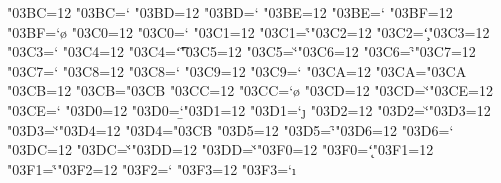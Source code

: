 \catcode"03BC=12 \lccode"03BC=`\m
\catcode"03BD=12 \lccode"03BD=`\n
\catcode"03BE=12 \lccode"03BE=`\x
\catcode"03BF=12 \lccode"03BF=`\o
\catcode"03C0=12 \lccode"03C0=`\p
\catcode"03C1=12 \lccode"03C1=`\r
\catcode"03C2=12 \lccode"03C2=`\c
\catcode"03C3=12 \lccode"03C3=`\s
\catcode"03C4=12 \lccode"03C4=`\t
\catcode"03C5=12 \lccode"03C5=`\u
\catcode"03C6=12 \lccode"03C6=`\f
\catcode"03C7=12 \lccode"03C7=`\q
\catcode"03C8=12 \lccode"03C8=`\y
\catcode"03C9=12 \lccode"03C9=`\w
\catcode"03CA=12 \lccode"03CA="03CA
\catcode"03CB=12 \lccode"03CB="03CB
\catcode"03CC=12 \lccode"03CC=`\o
\catcode"03CD=12 \lccode"03CD=`\u
\catcode"03CE=12 \lccode"03CE=`\w
\catcode"03D0=12 \lccode"03D0=`\b
\catcode"03D1=12 \lccode"03D1=`\j
\catcode"03D2=12 \lccode"03D2=`\u
\catcode"03D3=12 \lccode"03D3=`\u
\catcode"03D4=12 \lccode"03D4="03CB
\catcode"03D5=12 \lccode"03D5=`\f
\catcode"03D6=12 \lccode"03D6=`\p
\catcode"03DC=12 \lccode"03DC=`\v
\catcode"03DD=12 \lccode"03DD=`\v
\catcode"03F0=12 \lccode"03F0=`\k
\catcode"03F1=12 \lccode"03F1=`\r
\catcode"03F2=12 \lccode"03F2=`\s
\catcode"03F3=12 \lccode"03F3=`\i
\endinput